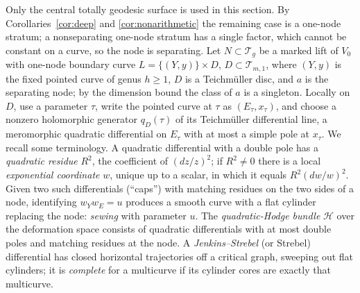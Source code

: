 \documentclass[11pt]{article}
\newcommand{\T}{\mathcal T}
\theoremstyle{remark}
\begin{document}
Only the central totally geodesic surface is used in this section.
By Corollaries~\ref{cor:deep} and \ref{cor:nonarithmetic}
the remaining case is a one-node stratum; a nonseparating one-node
stratum has a single factor, which cannot be constant on a curve, so
the node is separating. Let \(N\subset\T_g\) be a marked lift of
\(V_0\) with one-node boundary curve
\(L=\{(Y,y)\}\times D\), \(D\subset\T_{m,1}\),
where \((Y,y)\) is the fixed pointed curve of genus \(h\ge1\),
\(D\) is a Teichm\"uller disc, and \(a\) is the separating node;
by the dimension bound the class of \(a\) is a singleton. Locally on
\(D\), use a parameter \(\tau\), write the pointed curve at \(\tau\)
as \((E_\tau,x_\tau)\), and choose a nonzero holomorphic generator
\(q_D(\tau)\) of its Teichm\"uller differential line, a meromorphic
quadratic differential on \(E_\tau\) with at most a simple pole at
\(x_\tau\). We recall some terminology.
A quadratic differential with a double pole has a \emph{quadratic
residue} \(R^2\), the coefficient of \((dz/z)^2\); if \(R^2\ne0\)
there is a local \emph{exponential coordinate} \(w\), unique up to a
scalar, in which it equals \(R^2(dw/w)^2\). Given two such
differentials (``caps'') with matching residues on the two sides of
a node, identifying \(w_Yw_E=u\) produces a smooth curve with a flat
cylinder replacing the node: \emph{sewing} with parameter \(u\).
The \emph{quadratic-Hodge bundle} \(\mathcal H\) over the
deformation space consists of quadratic differentials with at most
double poles and matching residues at the node. A
\emph{Jenkins--Strebel} (or Strebel) differential has closed
horizontal trajectories off a critical graph, sweeping out flat
cylinders; it is \emph{complete} for a multicurve if its cylinder
cores are exactly that multicurve.
\end{document}
